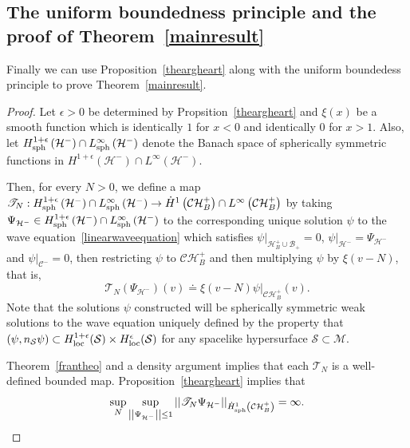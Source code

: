 \documentclass[A4,10pt]{article}
\begin{document}
\subsection{The uniform boundedness principle and the proof of Theorem~\ref{mainresult}}\label{finishhim}
Finally we can use Proposition~\ref{theargheart} along with the uniform boundedess principle to prove Theorem~\ref{mainresult}.
\begin{proof}Let $\epsilon > 0$ be determined by Propsition~\ref{theargheart} and $\xi(x)$ be a smooth function which is identically $1$ for $x < 0$ and identically $0$ for $x > 1$. Also, let $H^{1+\epsilon}_{{\rm sph}}\left(\mathcal{H}^-\right) \cap L^{\infty}_{{\rm sph}}\left(\mathcal{H}^-\right)$ denote the Banach space of spherically symmetric functions in $H^{1+\epsilon}\left(\mathcal{H}^-\right) \cap L^{\infty}\left(\mathcal{H}^-\right)$.

Then, for every $N >0$, we define a map $\mathscr{T}_N: H^{1+\epsilon}_{{\rm sph}}\left(\mathcal{H}^-\right) \cap L^{\infty}_{{\rm sph}}\left(\mathcal{H}^-\right) \to \dot{H}^1\left(\mathcal{CH}^+_B\right) \cap L^{\infty}\left(\mathcal{CH}^+_B\right)$ by taking $\Psi_{\mathcal{H}^-} \in H^{1+\epsilon}_{{\rm sph}}\left(\mathcal{H}^-\right) \cap L^{\infty}_{{\rm sph}}\left(\mathcal{H}^-\right) $ to the corresponding unique solution $\psi$ to the wave equation~\eqref{linearwaveequation} which satisfies $\psi|_{\mathcal{H}^+_B\cup\mathcal{B}_+} = 0$, $\psi|_{\mathcal{H}^-} = \Psi_{\mathcal{H}^-}$ and $\psi|_{\mathcal{C}^-} = 0$, then  restricting $\psi$ to $\mathcal{CH}^+_B$ and then multiplying $\psi$ by $\xi\left(v-N\right)$, that is,
\[\mathscr{T}_N\left(\Psi_{\mathcal{H}^-}\right)\left(v\right) \doteq \xi\left(v-N\right)\psi|_{\mathcal{CH}^+_B}\left(v\right).\]
Note that the solutions $\psi$ constructed will be spherically symmetric weak solutions to the wave equation uniquely defined by the property that $\left(\psi,n_{\mathcal{S}}\psi\right) \subset
H^{1+\epsilon}_{{\rm loc}}(\mathcal{S})\times H^{\epsilon}_{{\rm loc}}(\mathcal{S})$ for any 
spacelike hypersurface $\mathcal{S} \subset \mathcal{M}$.

Theorem~\ref{frantheo} and a density argument implies that each $\mathscr{T}_N$ is a well-defined bounded map. Proposition~\ref{theargheart} implies that
\[\sup_N\sup_{\left\vert\left\vert \Psi_{\mathcal{H}^-}\right\vert\right\vert \leq 1}\left\vert\left\vert \mathscr{T}_N\Psi_{\mathcal{H}^-}\right\vert\right\vert_{\dot{H}^1_{{\rm sph}}\left(\mathcal{CH}^+_B\right)} = \infty.\]


\end{proof}
\end{document}
